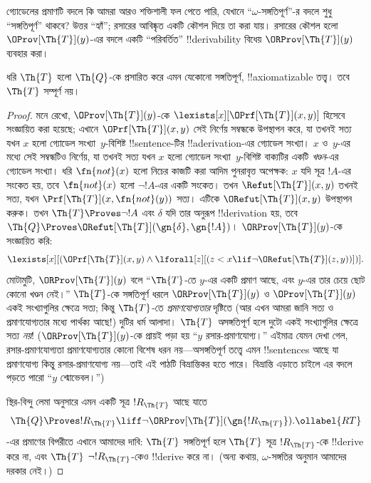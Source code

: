\documentclass[../../../include/open-logic-section]{subfiles}
\begin{document}


গ্যোডেলের প্রমাণটি বদলে কি আমরা আরও শক্তিশালী ফল পেতে পারি, যেখানে
``$\omega$-সঙ্গতিপূর্ণ''-র বদলে শুধু ``সঙ্গতিপূর্ণ'' থাকবে? উত্তর
``হ্যাঁ''; রসারের আবিষ্কৃত একটি কৌশল দিয়ে তা করা যায়। রসারের কৌশল হলো
$\OProv[\Th{T}](y)$-এর বদলে একটি ``পরিবর্তিত'' !!{derivability} বিধেয়
$\ORProv[\Th{T}](y)$ ব্যবহার করা।

\begin{thm}
ধরি $\Th{T}$ হলো $\Th{Q}$-কে প্রসারিত করে এমন যেকোনো সঙ্গতিপূর্ণ,
!!{axiomatizable} তত্ত্ব। তবে $\Th{T}$ সম্পূর্ণ নয়।
\end{thm}

\begin{proof}
মনে রেখো, $\OProv[\Th{T}](y)$-কে
$\lexists[x][\OPrf[\Th{T}](x, y)]$ হিসেবে সংজ্ঞায়িত করা হয়েছে; এখানে
$\OPrf[\Th{T}](x, y)$ সেই নির্ণেয় সম্বন্ধকে উপস্থাপন করে, যা তখনই সত্য
যখন $x$ হলো গ্যোডেল সংখ্যা~$y$-বিশিষ্ট !!{sentence}-টির
!!a{derivation}-এর গ্যোডেল সংখ্যা। $x$ ও~$y$-এর মধ্যে সেই সম্বন্ধটিও
নির্ণেয়, যা তখনই সত্য যখন $x$ হলো গ্যোডেল সংখ্যা~$y$-বিশিষ্ট বাক্যটির
একটি \emph{খণ্ডন}-এর গ্যোডেল সংখ্যা। ধরি $\fn{not}(x)$ হলো নিচের কাজটি
করা আদিম পুনরাবৃত্ত অপেক্ষক: $x$ যদি সূত্র $!A$-এর সংকেত হয়, তবে
$\fn{not}(x)$ হলো $\lnot !A$-এর একটি সংকেত। তখন
$\Refut[\Th{T}](x, y)$ তখনই সত্য, যখন
$\Prf[\Th{T}](x, \fn{not}(y))$ সত্য। এটিকে $\ORefut[\Th{T}](x, y)$
উপস্থাপন করুক। তখন $\Th{T} \Proves \lnot !A$ এবং $\delta$ যদি তার
অনুরূপ !!{derivation} হয়, তবে $\Th{Q} \Proves
\ORefut[\Th{T}](\gn{\delta}, \gn{!A})$। $\ORProv[\Th{T}](y)$-কে
সংজ্ঞায়িত করি:
\[
\lexists[x][(\OPrf[\Th{T}](x,y) \land \lforall[z][(z < x \lif \lnot
  \ORefut[\Th{T}](z,y))])].
\]
মোটামুটি, $\ORProv[\Th{T}](y)$ বলে ``$\Th{T}$-তে $y$-এর একটি প্রমাণ
আছে, এবং $y$-এর তার চেয়ে ছোট কোনো খণ্ডন নেই।'' $\Th{T}$-কে
সঙ্গতিপূর্ণ ধরলে $\ORProv[\Th{T}](y)$ ও $\OProv[\Th{T}](y)$ একই
সংখ্যাগুলির ক্ষেত্রে সত্য; কিন্তু $\Th{T}$-তে \emph{প্রমাণযোগ্যতার}
দৃষ্টিতে (আর এখন আমরা জানি সত্য ও প্রমাণযোগ্যতার মধ্যে পার্থক্য আছে!)
দুটির ধর্ম আলাদা। $\Th{T}$ \emph{অ}সঙ্গতিপূর্ণ হলে দুটো একই সংখ্যাগুলির
ক্ষেত্রে সত্য \emph{নয়}!{} ($\ORProv[\Th{T}](y)$-কে প্রায়ই পড়া হয়
``$y$ রসার-প্রমাণযোগ্য।'' এইমাত্র যেমন দেখা গেল, রসার-প্রমাণযোগ্যতা
প্রমাণযোগ্যতার কোনো বিশেষ ধরন নয়—অসঙ্গতিপূর্ণ তত্ত্বে এমন !!{sentence}s
আছে যা প্রমাণযোগ্য কিন্তু রসার-প্রমাণযোগ্য নয়—তাই এই পাঠটি বিভ্রান্তিকর
হতে পারে। বিভ্রান্তি এড়াতে চাইলে এর বদলে পড়তে পারো ``$y$
শ্মোভেবল।'')

স্থির-বিন্দু লেমা অনুসারে এমন একটি সূত্র $!R_\Th{T}$ আছে যাতে
\begin{equation}
  \Th{Q} \Proves !R_\Th{T} \liff \lnot \ORProv[\Th{T}](\gn{!R_\Th{T}}).
  \ollabel{RT}
\end{equation}
-এর প্রমাণের বিপরীতে এখানে আমাদের
দাবি: $\Th{T}$ সঙ্গতিপূর্ণ হলে $\Th{T}$ সূত্র $!R_\Th{T}$-কে
!!{derive} করে না, এবং $\Th{T}$ $\lnot !R_\Th{T}$-কেও !!{derive} করে
না। (অন্য কথায়,
$\omega$-সঙ্গতির অনুমান আমাদের দরকার নেই।)


\end{proof}
\end{document}
